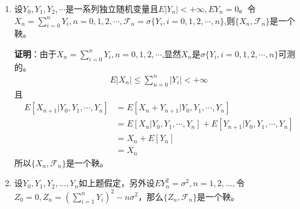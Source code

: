 \begin{enumerate}
	\item 设\(Y_0,Y_1,Y_2,\cdots\)是一系列独立随机变量且\(E\lvert Y_n\rvert<+\infty,EY_n=0\)。令\(X_n=\sum_{i=0}^{n}Y_i,n=0,1,2,\cdots,\mathscr{F}_n=\sigma\{Y_i,i=0,1,2,\cdots,n\}\),则\(\{X_n,\mathscr{F}_n\}\)是一个鞅。

	      \textbf{证明}：由于\(X_n=\sum_{i=0}^{n}Y_i,n=0,1,2,\cdots\),显然\(X_n\)是\(\sigma\{Y_i,i=0,1,2,\cdots,n\}\)可测的。
	      \begin{align*}
		      E|X_n|\leqslant \sum_{n=0}^{n}|Y_i|<+\infty
	      \end{align*}
	      且
	      \begin{align*}
		      E[X_{n+1}|Y_0,Y_1,\cdots,Y_n]
		       & =E[X_n+Y_{n+1}|Y_0,Y_1,\cdots,Y_n]                       \\
		       & =E[X_n|Y_0,Y_1,\cdots,Y_n]+E[Y_{n+1}|Y_0,Y_1,\cdots,Y_n] \\
		       & =X_n+E[Y_n]                                              \\
		       & =X_n
	      \end{align*}
	      所以\(\{X_n,\mathscr{F}_n\}\)是一个鞅。
	\item 设\(Y_0,Y_1,Y_2,\ldots ,Y_n\)如上题假定，另外设\(EY^2_n=\sigma^2,n=1,2,\ldots,\)令\(Z_0=0,Z_n=\left(\sum_{i=1}^{n}Y_i\right)^2-n\sigma^2\)，那么\(\{Z_n,\mathscr{F}_n\}\)是一个鞅。


\end{enumerate}
